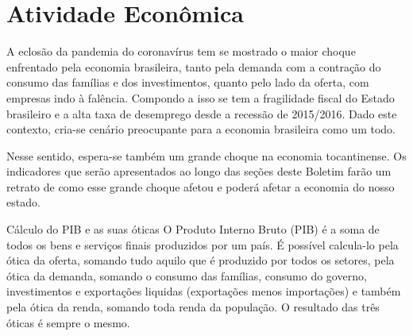 \chapter{Atividade Econômica}
\par A eclosão da pandemia do coronavírus tem se mostrado o maior choque enfrentado pela economia brasileira, tanto pela demanda com a contração do consumo das famílias e dos investimentos, quanto pelo lado da oferta, com empresas indo à falência. Compondo a isso se tem a fragilidade fiscal do Estado brasileiro e a alta taxa de desemprego desde a recessão de 2015/2016. Dado este contexto, cria-se cenário preocupante para a economia brasileira como um todo.
\par Nesse sentido, espera-se também um grande choque na economia tocantinense. Os indicadores que serão apresentados ao longo das seções deste Boletim farão um retrato de como esse grande choque afetou e poderá afetar a economia do nosso estado.
\begin{smbox}[label={labelbox},nameref={Cálculo do PIB e as suas óticas}]{Cálculo do PIB e as suas óticas}
	O Produto Interno Bruto (PIB) é a soma de todos os bens e serviços finais produzidos por um país. É possível calcula-lo pela ótica da oferta, somando tudo aquilo que é produzido por todos os setores, pela ótica da demanda, somando o consumo das famílias, consumo do governo, investimentos e exportações liquidas (exportações menos importações) e também pela ótica da renda, somando toda renda da população. O resultado das três óticas é sempre o mesmo.
\end{smbox}
